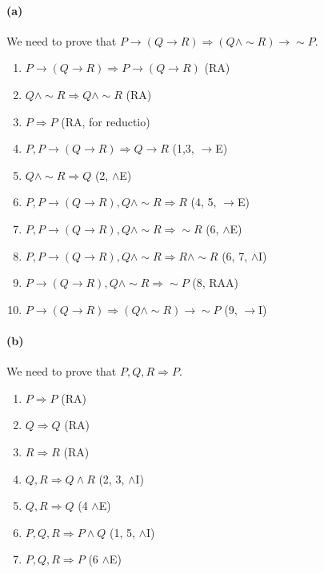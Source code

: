 \documentclass[sloppy, journal, git, bytitle]{humapap}
\begin{document}
\paragraph{(a)} We need to prove that $P\rightarrow (Q\rightarrow R)\Rightarrow (Q\wedge\sim R)\rightarrow\sim P$. 
\begin{enumerate}
	\item $P\rightarrow (Q\rightarrow R)\Rightarrow P\rightarrow (Q\rightarrow R)$ \hfil (RA)
	\item $Q\wedge\sim R\Rightarrow Q\wedge\sim R$ \hfil (RA)
	\item $P\Rightarrow P$ \hfil (RA, for reductio)
	\item $P, P\rightarrow (Q\rightarrow R)\Rightarrow Q\rightarrow R$ \hfil (1,3, $\rightarrow$E)
	\item $Q\wedge\sim R\Rightarrow Q$ \hfil (2, $\wedge$E)
	\item $P, P\rightarrow (Q\rightarrow R), Q\wedge\sim R\Rightarrow R$ \hfil (4, 5, $\rightarrow$E)
	\item $P, P\rightarrow (Q\rightarrow R), Q\wedge\sim R\Rightarrow \sim R$ \hfil (6, $\wedge$E)
	\item $P, P\rightarrow (Q\rightarrow R), Q\wedge\sim R\Rightarrow R\wedge\sim R$ \hfil (6, 7, $\wedge$I)
	\item $P\rightarrow (Q\rightarrow R), Q\wedge\sim R\Rightarrow\sim P$ \hfil (8, RAA)
	\item $P\rightarrow (Q\rightarrow R)\Rightarrow(Q\wedge\sim R)\rightarrow\sim P$ \hfil (9, $\rightarrow$I)
\end{enumerate}


\paragraph{(b)} We need to prove that $P, Q, R\Rightarrow P$.
\begin{enumerate}
	\item $P\Rightarrow P$ \hfil (RA)
	\item $Q\Rightarrow Q$ \hfil (RA)
	\item $R\Rightarrow R$ \hfil (RA)
	\item $Q, R\Rightarrow Q\wedge R$ \hfil (2, 3, $\wedge$I)
	\item $Q, R\Rightarrow Q$ \hfil (4 $\wedge$E)
	\item $P, Q, R\Rightarrow P\wedge Q$ \hfil (1, 5, $\wedge$I)
	\item $P, Q, R\Rightarrow P$ \hfil (6 $\wedge$E)
\end{enumerate}
\end{document}
